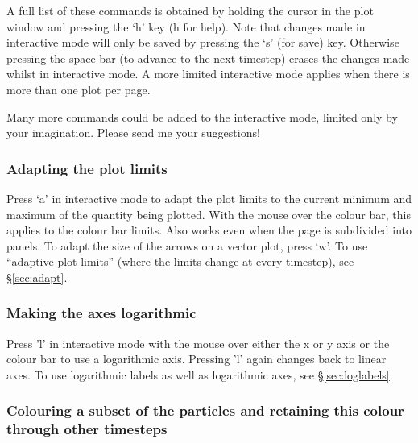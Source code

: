 \documentclass[a4paper,10pt]{article}
\begin{document}
 A full list of these commands is obtained by holding
the cursor in the plot window and pressing the `h' key (h for help). Note that changes made in interactive mode will only be saved by pressing the
`s' (for save) key. Otherwise pressing the space bar (to advance to the next
timestep) erases the changes made whilst in interactive mode. A more limited
interactive mode applies when there is more than one plot per page.

 Many more commands could be added to
the interactive mode, limited only by your imagination. Please send me your suggestions!

\subsubsection{ Adapting the plot limits}
 Press `a' in interactive mode to adapt the plot limits to the current minimum and maximum of the quantity being plotted. With the mouse over the colour bar, this applies to the colour bar limits. Also works even when the page is subdivided into panels. To adapt the size of the arrows on a vector plot, press `w'. To use ``adaptive plot limits'' (where the limits change at every timestep), see \S\ref{sec:adapt}.

\subsubsection{ Making the axes logarithmic}
 Press 'l' in interactive mode with the mouse over either the x or y axis or the colour bar to use a logarithmic axis. Pressing 'l' again changes back to linear axes. To use logarithmic labels as well as logarithmic axes, see \S\ref{sec:loglabels}.

\subsubsection{ Colouring a subset of the particles and retaining this colour through other timesteps}
\label{sec:colourparts}
\end{document}
